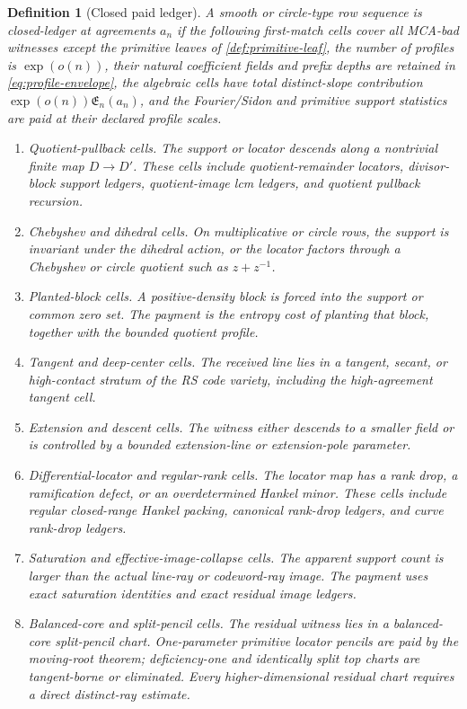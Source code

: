 \documentclass[11pt,a4paper]{amsart}
\numberwithin{equation}{section}
\newtheorem{definition}[theorem]{Definition}
\theoremstyle{remark}
\newcommand{\Eprof}{\mathfrak E}
\begin{document}
\begin{definition}[Closed paid ledger]\label{def:closed-ledger}
A smooth or circle-type row sequence is \emph{closed-ledger} at agreements
\(a_n\) if
the following first-match cells cover all MCA-bad witnesses except the
primitive leaves of \cref{def:primitive-leaf}, the number of profiles is
\(\exp(o(n))\), their natural coefficient fields and prefix depths are
retained in \eqref{eq:profile-envelope}, the algebraic cells have total
distinct-slope contribution \(\exp(o(n))\Eprof_n(a_n)\), and the
Fourier/Sidon and primitive support statistics are paid at their declared
profile scales.
\begin{enumerate}[label=\textup{(C\arabic*)},leftmargin=2.7em]
    \item \emph{Quotient-pullback cells.}  The support or locator descends along a nontrivial finite map \(D\to D'\).  These cells include quotient-remainder locators, divisor-block support ledgers, quotient-image lcm ledgers, and quotient pullback recursion.
    \item \emph{Chebyshev and dihedral cells.}  On multiplicative or circle rows, the support is invariant under the dihedral action, or the locator factors through a Chebyshev or circle quotient such as \(z+z^{-1}\).
    \item \emph{Planted-block cells.}  A positive-density block is forced into the support or common zero set.  The payment is the entropy cost of planting that block, together with the bounded quotient profile.
    \item \emph{Tangent and deep-center cells.}  The received line lies in a tangent, secant, or high-contact stratum of the RS code variety, including the high-agreement tangent cell.
    \item \emph{Extension and descent cells.}  The witness either descends to a smaller field or is controlled by a bounded extension-line or extension-pole parameter.
    \item \emph{Differential-locator and regular-rank cells.}  The locator map has a rank drop, a ramification defect, or an overdetermined Hankel minor.  These cells include regular closed-range Hankel packing, canonical rank-drop ledgers, and curve rank-drop ledgers.
    \item \emph{Saturation and effective-image-collapse cells.}  The apparent support count is larger than the actual line-ray or codeword-ray image.  The payment uses exact saturation identities and exact residual image ledgers.
    \item \emph{Balanced-core and split-pencil cells.}  The residual witness lies in a balanced-core split-pencil chart.  One-parameter primitive locator pencils are paid by the moving-root theorem; deficiency-one and identically split top charts are tangent-borne or eliminated.  Every higher-dimensional residual chart requires a direct distinct-ray estimate.

\end{enumerate}
\end{definition}
\end{document}
